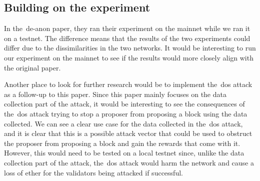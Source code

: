 \subsection{Building on the experiment}\label{subsec:further-research}
In the~\gls{de-anon paper}, they ran their experiment on the mainnet while we ran it on a testnet.
The difference means that the results of the two experiments could differ due to the dissimilarities in the two networks.
It would be interesting to run our experiment on the mainnet to see if the results would more closely align with the original paper.


Another place to look for further research would be to implement the~\gls{dos} attack as a follow-up to this paper.
Since this paper mainly focuses on the data collection part of the attack, it would be interesting to see the consequences of the~\gls{dos} attack trying to stop a proposer from proposing a block using the data collected.
We can see a clear use case for the data collected in the~\gls{dos} attack, and it is clear that this is a possible attack vector that could be used to obstruct the proposer from proposing a block and gain the rewards that come with it.
However, this would need to be tested on a local testnet since, unlike the data collection part of the attack, the~\gls{dos} attack would harm the network and cause a loss of ether for the validators being attacked if successful.
